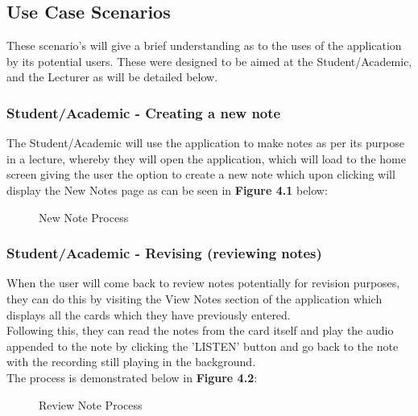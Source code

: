 \documentclass[oneside]{report}
\begin{document}

		\subsection{Use Case Scenarios}
		These scenario's will give a brief understanding as to the uses of the application by its potential users. These were designed to be aimed at the Student/Academic, and the Lecturer as will be detailed below.
		\newpage
			\subsubsection{Student/Academic - Creating a new note}
			The Student/Academic will use the application to make notes as per its purpose in a lecture, whereby they will open the application, which will load to the home screen giving the user the option to create a new note which upon clicking will display the New Notes page as can be seen in \textbf{Figure 4.1} below:

		\begin{figure}[H]
			\begin{center}
			\end{center}
			\caption[New Note Process]{New Note Process}
		\end{figure}
		\newpage

			\subsubsection{Student/Academic - Revising (reviewing notes)}
			When the user will come back to review notes potentially for revision purposes, they can do this by visiting the View Notes section of the application which displays all the cards which they have previously entered.\\

Following this, they can read the notes from the card itself and play the audio appended to the note by clicking the 'LISTEN' button and go back to the note with the recording still playing in the background.\\

The process is demonstrated below in \textbf{Figure 4.2}:

		\begin{figure}[H]
			\begin{center}
			\end{center}
			\caption[Review Note Process]{Review Note Process}
		\end{figure}
		\newpage
\end{document}
